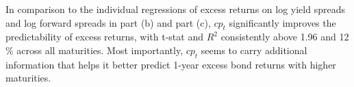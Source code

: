 \documentclass[11pt]{article}
\begin{document}
In comparison to the individual regressions of excess returns on log yield spreads and log forward spreads in part (b) and part (c), $cp_t$ significantly improves the predictability of excess returns, with t-stat and $R^{2}$ consistently above 1.96 and 12 \% across all maturities. Most importantly, $cp_t$ seems to carry additional information that helps it better predict 1-year excess bond returns with higher maturities. 

  
 
\end{document}
